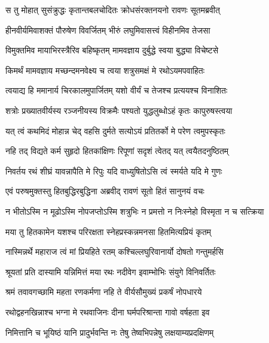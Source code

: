 
\twolineshloka
{स तु मोहात् सुसंक्रुद्धः कृतान्तबलचोदितः}
{क्रोधसंरक्तनयनो रावणः सूतमब्रवीत्} %

\twolineshloka
{हीनवीर्यमिवाशक्तं पौरुषेण विवर्जितम्}
{भीरुं लघुमिवासत्त्वं विहीनमिव तेजसा} %

\twolineshloka
{विमुक्तमिव मायाभिरस्त्रैरिव बहिष्कृतम्}
{मामवज्ञाय दुर्बुद्धे स्वया बुद्ध्या विचेष्टसे} %

\twolineshloka
{किमर्थं मामवज्ञाय मच्छन्दमनवेक्ष्य च}
{त्वया शत्रुसमक्षं मे रथोऽयमपवाहितः} %

\twolineshloka
{त्वयाद्य हि ममानार्य चिरकालमुपार्जितम्}
{यशो वीर्यं च तेजश्च प्रत्ययश्च विनाशितः} %

\twolineshloka
{शत्रोः प्रख्यातवीर्यस्य रञ्जनीयस्य विक्रमैः}
{पश्यतो युद्धलुब्धोऽहं कृतः कापुरुषस्त्वया} %

\twolineshloka
{यत् त्वं कथमिदं मोहान्न चेद् वहसि दुर्मते}
{सत्योऽयं प्रतितर्को मे परेण त्वमुपस्कृतः} %

\twolineshloka
{नहि तद् विद्यते कर्म सुहृदो हितकांक्षिणः}
{रिपूणां सदृशं त्वेतद् यत् त्वयैतदनुष्ठितम्} %

\twolineshloka
{निवर्तय रथं शीघ्रं यावन्नापैति मे रिपुः}
{यदि वाध्युषितोऽसि त्वं स्मर्यते यदि मे गुणः} %

\twolineshloka
{एवं परुषमुक्तस्तु हितबुद्धिरबुद्धिना}
{अब्रवीद् रावणं सूतो हितं सानुनयं वचः} %

\twolineshloka
{न भीतोऽस्मि न मूढोऽस्मि नोपजप्तोऽस्मि शत्रुभिः}
{न प्रमत्तो न निःस्नेहो विस्मृता न च सत्क्रिया} %

\twolineshloka
{मया तु हितकामेन यशश्च परिरक्षता}
{स्नेहप्रस्कन्नमनसा हितमित्यप्रियं कृतम्} %

\twolineshloka
{नास्मिन्नर्थे महाराज त्वं मां प्रियहिते रतम्}
{कश्चिल्लघुरिवानार्यो दोषतो गन्तुमर्हसि} %

\twolineshloka
{श्रूयतां प्रति दास्यामि यन्निमित्तं मया रथः}
{नदीवेग इवाम्भोभिः संयुगे विनिवर्तितः} %

\twolineshloka
{श्रमं तवावगच्छामि महता रणकर्मणा}
{नहि ते वीर्यसौमुख्यं प्रकर्षं नोपधारये} %

\twolineshloka
{रथोद्वहनखिन्नाश्च भग्ना मे रथवाजिनः}
{दीना घर्मपरिश्रान्ता गावो वर्षहता इव} %

\twolineshloka
{निमित्तानि च भूयिष्ठं यानि प्रादुर्भवन्ति नः}
{तेषु तेष्वभिपन्नेषु लक्षयाम्यप्रदक्षिणम्} %

